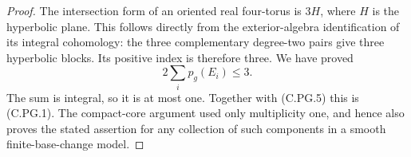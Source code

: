 \begin{proof}
The intersection form of an oriented
real four-torus is $3H$, where $H$ is
the hyperbolic plane. This follows
directly from the exterior-algebra
identification of its integral
cohomology: the three complementary
degree-two pairs give three hyperbolic
blocks. Its positive index is therefore
three. We have proved
\[
                    2\sum_i p_g(E_i)\le3.
                                                               \tag{C.PG.9}
\]
The sum is integral, so it is at most
one. Together with (C.PG.5) this is
(C.PG.1). The compact-core argument
used only multiplicity one, and hence
also proves the stated assertion for
any collection of such components in
a smooth finite-base-change model.
\end{proof}
